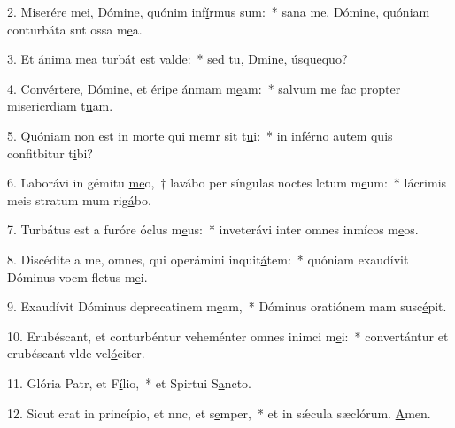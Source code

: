 2. Miserére mei, Dómine, quónim inf\uline{í}rmus sum:~* sana me, Dómine, quóniam conturbáta snt ossa m\uline{e}a.\par 
3. Et ánima mea turbát est v\uline{a}lde:~* sed tu, Dmine, \uline{ú}squequo?\par 
4. Convértere, Dómine, et éripe ánmam m\uline{e}am:~* salvum me fac propter misericrdiam t\uline{u}am.\par 
5. Quóniam non est in morte qui memr sit t\uline{u}i:~* in inférno autem quis confitbitur t\uline{i}bi?\par 
6. Laborávi in gémitu \uline{me}o,~† lavábo per síngulas noctes lctum m\uline{e}um:~* lácrimis meis stratum mum rig\uline{á}bo.\par 
7. Turbátus est a furóre óclus m\uline{e}us:~* inveterávi inter omnes inmícos m\uline{e}os.\par 
8. Discédite a me, omnes, qui operámini inquit\uline{á}tem:~* quóniam exaudívit Dóminus vocm fletus m\uline{e}i.\par 
9. Exaudívit Dóminus deprecatinem m\uline{e}am,~* Dóminus oratiónem mam susc\uline{é}pit.\par 
10. Erubéscant, et conturbéntur veheménter omnes inimci m\uline{e}i:~* convertántur et erubéscant vlde vel\uline{ó}citer.\par 
11. Glória Patr, et F\uline{í}lio,~* et Spirtui S\uline{a}ncto.\par 
12. Sicut erat in princípio, et nnc, et s\uline{e}mper,~* et in sǽcula sæclórum. \uline{A}men.\par 

